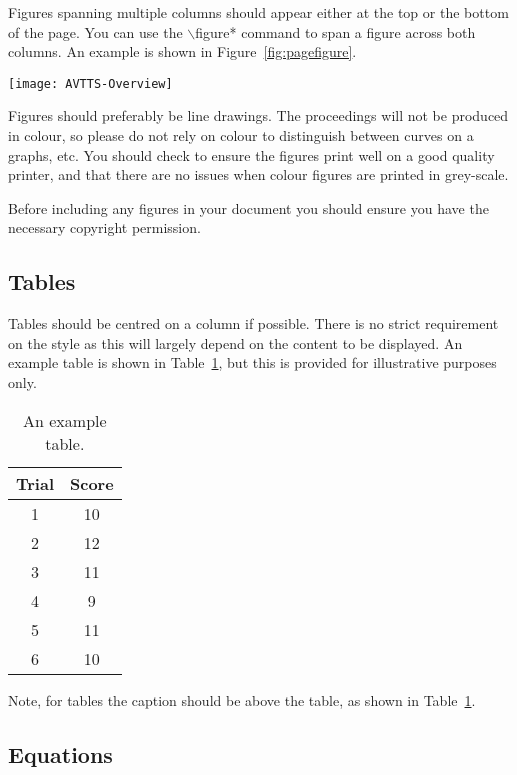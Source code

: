 \documentclass{cmppgr}
\begin{document}
Figures spanning multiple columns should appear either at the top or the bottom of the page. You can use the $\backslash$figure* command to span a figure across both columns. An example is shown in Figure~\ref{fig:pagefigure}.

\begin{figure*}[tb]
\centering
\texttt{[image: AVTTS-Overview]}
\caption{An example of a figure spanning both columns and centred on a page. Again, the figure is not centred automatically.}
\label{fig:pagefigure}
\end{figure*}

Figures should preferably be line drawings. The proceedings will not be produced in colour, so please do not rely on colour to distinguish between curves on a graphs, etc. You should check to ensure the figures print well on a good quality printer, and that there are no issues when colour figures are printed in grey-scale.

Before including any figures in your document you should ensure you have the necessary copyright permission.

\subsection{Tables}

Tables should be centred on a column if possible. There is no strict requirement on the style as this will largely depend on the content to be displayed. An example table is shown in Table~\ref{tab:example}, but this is provided for illustrative purposes only.

\begin{table}[h]
\centering
\caption{An example table.}
\begin{tabular}{|c|c|}
\hline
Trial & Score \\\hline\hline
1 & 10 \\
2 & 12 \\
3 & 11 \\
4 & 9 \\
5 & 11 \\
6 & 10 \\\hline
\end{tabular}
\label{tab:example}
\end{table}

Note, for tables the caption should be above the table, as shown in Table~\ref{tab:example}.

\subsection{Equations}
\end{document}
